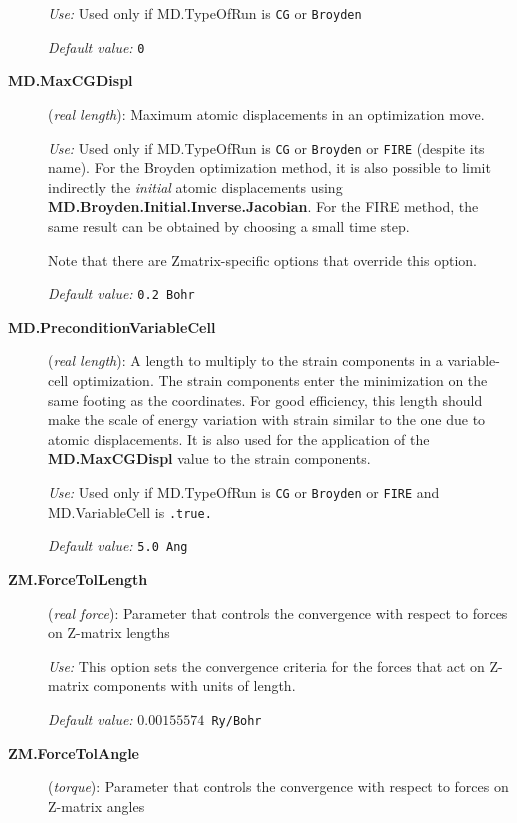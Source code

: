 \begin{description}
\textit{Use:} Used only if MD.TypeOfRun is \texttt{CG} or \texttt{Broyden}

\textit{Default value:} \texttt{0}

\item[\textbf{MD.MaxCGDispl}] (\textit{real length}):
Maximum atomic displacements in an optimization move.

\textit{Use:} Used only if MD.TypeOfRun is \texttt{CG} or \texttt{Broyden} or
\texttt{FIRE} (despite its name). For the Broyden optimization method, it is also
possible to limit indirectly the \textit{initial\/} atomic displacements
using \textbf{MD.Broyden.Initial.Inverse.Jacobian}. For the FIRE method,
the same result can be obtained by choosing a small time step.

Note that there are Zmatrix-specific options that override this option.

\textit{Default value:} \texttt{0.2 Bohr}


\item[\textbf{MD.PreconditionVariableCell}] (\textit{real length}):
   A length to multiply to the strain
  components in a variable-cell optimization.  The strain components
  enter the minimization on the same footing as the coordinates. For
  good efficiency, this length should make the scale of energy
  variation with strain similar to the one due to atomic
  displacements. It is also used for the application of the \textbf{MD.MaxCGDispl} value to the strain components.

\textit{Use:} Used only if MD.TypeOfRun is \texttt{CG} or \texttt{Broyden} or
\texttt{FIRE} and MD.VariableCell is \texttt{.true.}

\textit{Default value:} \texttt{5.0 Ang}

\item[\textbf{ZM.ForceTolLength}] (\textit{real force}):
   Parameter that
  controls the convergence with respect to forces on Z-matrix lengths

\textit{Use:} This option sets the convergence criteria for the forces that
act on Z-matrix components with units of length.

\textit{Default value:} \texttt{$0.00155574$ Ry/Bohr}

\item[\textbf{ZM.ForceTolAngle}] (\textit{torque}):
   Parameter that
  controls the convergence with respect to forces on Z-matrix angles


\end{description}
